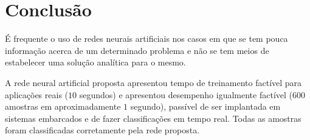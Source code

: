 
\section{Conclusão}

É frequente o uso de redes neurais artificiais nos casos em que se tem pouca
informação acerca de um determinado problema e não se tem meios de estabelecer
uma solução analítica para o mesmo.

A rede neural artificial proposta apresentou tempo de treinamento factível para
aplicações reais ($10$ segundos) e apresentou desempenho igualmente factível
($600$ amostras em aproximadamente $1$ segundo), passível de ser implantada em
sistemas embarcados e de fazer classificações em tempo real. Todas as amostras
foram classificadas corretamente pela rede proposta.
